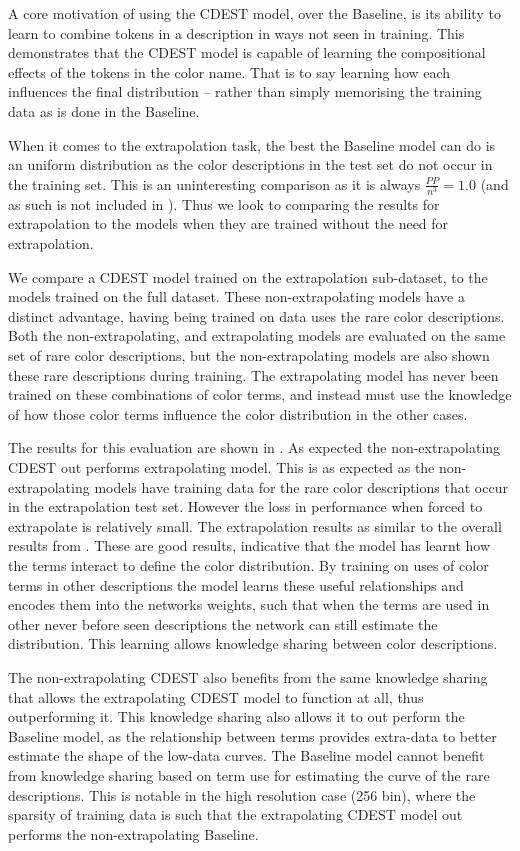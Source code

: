 \documentclass[11pt,letterpaper, twocolumn]{article}
\begin{document}
A core motivation of using the CDEST model, over the Baseline, is its ability to learn to combine tokens in a description in ways not seen in training.
This demonstrates that the CDEST model is capable of learning the compositional effects of the tokens in the color name.
That is to say learning how each influences the final distribution -- rather than simply memorising the training data as is done in the Baseline.

When it comes to the extrapolation task, the best the Baseline model can do is an uniform distribution as the color descriptions in the test set do not occur in the training set.
This is an uninteresting comparison as it is always $\frac{PP}{n^3}=1.0$ (and as such is not included in ).
Thus we look to comparing the results for extrapolation to the models when they are trained without the need for extrapolation.

We compare a CDEST model trained on the extrapolation sub-dataset, to the models trained on the full dataset.
These non-extrapolating models have a distinct advantage, having being trained on data uses the rare color descriptions.
Both the non-extrapolating, and extrapolating models are evaluated on the same set of rare color descriptions,
but the non-extrapolating models are also shown these rare descriptions during training.
The extrapolating model has never been trained on these combinations of color terms,
and instead must use the knowledge of how those color terms influence the color distribution in the other cases.

The results for this evaluation are shown in .
As expected the non-extrapolating CDEST out performs extrapolating model.
This is as expected as the non-extrapolating models have training data for the rare color descriptions that occur in the extrapolation test set.
However the loss in performance when forced to extrapolate is relatively small. The extrapolation results as similar to the overall results from .
These are good results, indicative that the model has learnt how the terms interact to define the color distribution.
By training on uses of color terms in other descriptions the model learns these useful relationships and encodes them into the networks weights, such that when the terms are used in other never before seen descriptions the network can still estimate the distribution.
This learning allows knowledge sharing between color descriptions.


The non-extrapolating CDEST also benefits from the same knowledge sharing that allows the extrapolating CDEST model to function at all, thus outperforming it.
This knowledge sharing also allows it to out perform the Baseline model, as the relationship between terms provides extra-data to better estimate the shape of the low-data curves.
The Baseline model cannot benefit from knowledge sharing based on term use for estimating the curve of the rare descriptions.
This is notable in the high resolution case (256 bin),
where the sparsity of training data is such that the extrapolating CDEST model out performs the non-extrapolating Baseline.
\end{document}
